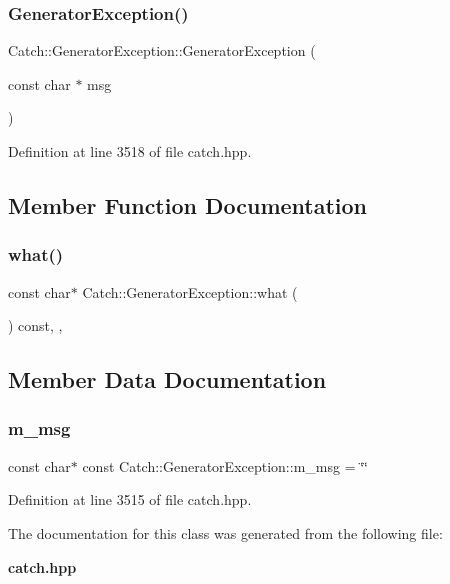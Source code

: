\subsubsection{GeneratorException()}
{\footnotesize\ttfamily Catch\+::\+Generator\+Exception\+::\+Generator\+Exception (\begin{DoxyParamCaption}\item[{const char $\ast$}]{msg }\end{DoxyParamCaption})\hspace{0.3cm}{\ttfamily [inline]}}



Definition at line 3518 of file catch.\+hpp.



\subsection{Member Function Documentation}
\mbox{\label{class_catch_1_1_generator_exception_ade029163144d136f12187e5b9a0161d5}} 
\subsubsection{what()}
{\footnotesize\ttfamily const char$\ast$ Catch\+::\+Generator\+Exception\+::what (\begin{DoxyParamCaption}{ }\end{DoxyParamCaption}) const\hspace{0.3cm}{\ttfamily [final]}, {\ttfamily [override]}, {\ttfamily [noexcept]}}



\subsection{Member Data Documentation}
\mbox{\label{class_catch_1_1_generator_exception_a493b6ec9e3be0e3852de73c87dba6e5e}} 
\subsubsection{m\_msg}
{\footnotesize\ttfamily const char$\ast$ const Catch\+::\+Generator\+Exception\+::m\+\_\+msg = \char`\"{}\char`\"{}\hspace{0.3cm}{\ttfamily [private]}}



Definition at line 3515 of file catch.\+hpp.



The documentation for this class was generated from the following file\+:\begin{DoxyCompactItemize}
\item 
\textbf{ catch.\+hpp}\end{DoxyCompactItemize}
